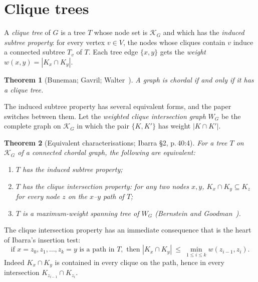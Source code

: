 \documentclass[11pt,a4paper,oneside]{report}
\theoremstyle{plain}
\newtheorem{theorem}{Theorem}[chapter]
\theoremstyle{definition}
\theoremstyle{remark}
\newcommand{\KG}{\mathcal{K}_G}
\begin{document}
\section{Clique trees}\label{sec:clique-trees}
\begin{definition}\label{def:clique-tree}
A \emph{clique tree} of \(G\) is a tree \(T\) whose node set is \(\KG\) and which has the
\emph{induced subtree property}: for every vertex \(v\in V\), the nodes whose cliques contain
\(v\) induce a connected subtree \(T_v\) of \(T\). Each tree edge \(\{x,y\}\) gets the
\emph{weight} \(w(x,y)=|K_x\cap K_y|\).
\end{definition}

\begin{theorem}[Buneman; Gavril; Walter~\cite{buneman1974,gavril1974,walter1978}]\label{thm:clique-tree-exists}
A graph is chordal if and only if it has a clique tree.
\end{theorem}

The induced subtree property has several equivalent forms, and the paper switches between them.
Let the \emph{weighted clique intersection graph} \(W_G\) be the complete graph on \(\KG\) in
which the pair \(\{K,K'\}\) has weight \(|K\cap K'|\).

\begin{theorem}[Equivalent characterisations; Ibarra \S2, p.\,40:4]\label{thm:ct-equiv}
For a tree \(T\) on \(\KG\) of a connected chordal graph, the following are equivalent:
\begin{enumerate}
\item \(T\) has the induced subtree property;
\item \(T\) has the \emph{clique intersection property}: for any two nodes \(x,y\),
  \(K_x\cap K_y\subseteq K_z\) for every node \(z\) on the \(x\)--\(y\) path of \(T\);
\item \(T\) is a maximum-weight spanning tree of \(W_G\)
  (Bernstein and Goodman~\cite{bernstein1981}).
\end{enumerate}
\end{theorem}

The clique intersection property has an immediate consequence that is the heart of Ibarra's
insertion test:
\begin{equation}\label{eq:path-min}
\text{if } x=z_0,z_1,\dots,z_k=y \text{ is a path in } T, \text{ then }
|K_x\cap K_y|\ \le\ \min_{1\le i\le k} w(z_{i-1},z_i).
\end{equation}
Indeed \(K_x\cap K_y\) is contained in every clique on the path, hence in every intersection
\(K_{z_{i-1}}\cap K_{z_i}\).
\end{document}
